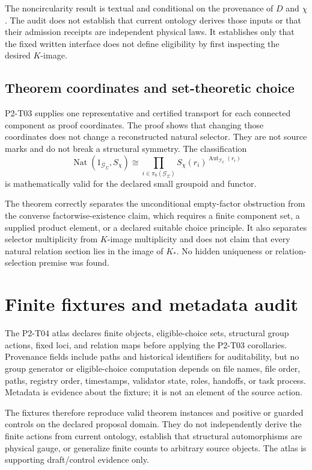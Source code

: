 \documentclass[11pt]{article}
\newcommand{\G}{\mathcal G_{\Sigma}}
\newcommand{\Sch}{S_{\chi}}
\begin{document}
The noncircularity result is textual and conditional on the provenance of
\(D\) and \(\chi\).  The audit does not establish that current ontology derives
those inputs or that their admission receipts are independent physical laws.
It establishes only that the fixed written interface does not define
eligibility by first inspecting the desired \(K\)-image.

\subsection{Theorem coordinates and set-theoretic choice}

P2-T03 supplies one representative and certified transport for each connected
component as proof coordinates.  The proof shows that changing those
coordinates does not change a reconstructed natural selector.  They are not
source marks and do not break a structural symmetry.  The classification
\[
  \operatorname{Nat}(1_{\G},\Sch)\cong
  \prod_{i\in\pi_0(\G)}
  \Sch(r_i)^{\operatorname{Aut}_{\G}(r_i)}
\]
is mathematically valid for the declared small groupoid and functor.

The theorem correctly separates the unconditional empty-factor obstruction
from the converse factorwise-existence claim, which requires a finite component
set, a supplied product element, or a declared suitable choice principle.  It
also separates selector multiplicity from \(K\)-image multiplicity and does not
claim that every natural relation section lies in the image of \(K_*\).  No
hidden uniqueness or relation-selection premise was found.

\section{Finite fixtures and metadata audit}

The P2-T04 atlas declares finite objects, eligible-choice sets, structural
group actions, fixed loci, and relation maps before applying the P2-T03
corollaries.  Provenance fields include paths and historical identifiers for
auditability, but no group generator or eligible-choice computation depends on
file names, file order, paths, registry order, timestamps, validator state,
roles, handoffs, or task process.  Metadata is evidence about the fixture; it
is not an element of the source action.

The fixtures therefore reproduce valid theorem instances and positive or
guarded controls on the declared proposal domain.  They do not independently
derive the finite actions from current ontology, establish that structural
automorphisms are physical gauge, or generalize finite counts to arbitrary
source objects.  The atlas is supporting draft/control evidence only.
\end{document}
